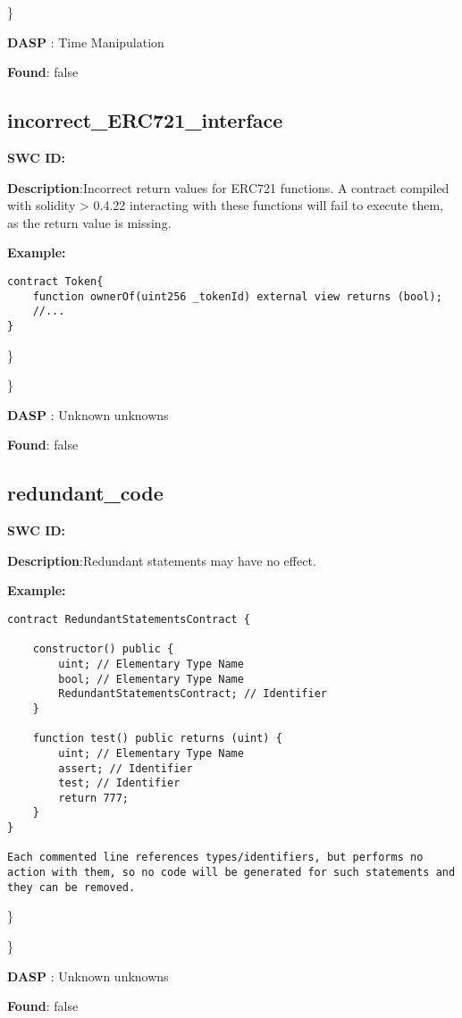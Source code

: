 \documentclass{article}
\begin{document}
\} 

\textbf{DASP} : Time Manipulation

\textbf{Found}: false

\subsection{incorrect\_ERC721\_interface} 
\textbf{SWC \textunderscore ID:} 

\textbf{Description}:Incorrect return values for ERC721 functions. A contract compiled with solidity > 0.4.22 interacting with these functions will fail to execute them, as the return value is missing.


\textbf{Example:} 
\begin{verbatim}
contract Token{
    function ownerOf(uint256 _tokenId) external view returns (bool);
    //...
}

\end{verbatim}\} 

\} 

\textbf{DASP} : Unknown unknowns

\textbf{Found}: false

\subsection{redundant\_code} 
\textbf{SWC \textunderscore ID:} 

\textbf{Description}:Redundant statements may have no effect.


\textbf{Example:} 
\begin{verbatim}
contract RedundantStatementsContract {

    constructor() public {
        uint; // Elementary Type Name
        bool; // Elementary Type Name
        RedundantStatementsContract; // Identifier
    }

    function test() public returns (uint) {
        uint; // Elementary Type Name
        assert; // Identifier
        test; // Identifier
        return 777;
    }
}

Each commented line references types/identifiers, but performs no action with them, so no code will be generated for such statements and they can be removed.

\end{verbatim}\} 

\} 

\textbf{DASP} : Unknown unknowns

\textbf{Found}: false
\end{document}
